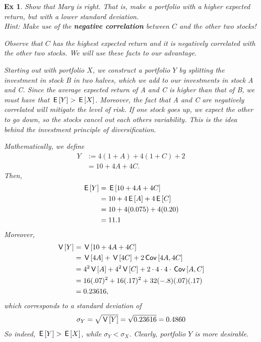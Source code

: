 \documentclass[a4paper,11pt]{article}
\newtheorem{exercise}[theorem]{Ex}
\begin{document}
\begin{exercise}
Show that Mary is right. That is, make a portfolio with a higher expected return, but with a lower standard deviation. \\
\textit{Hint: Make use of the \textbf{negative correlation} between $C$ and the other two stocks!}
\begin{solution}
Observe that $C$ has the highest expected return \textit{and} it is negatively correlated with the other two stocks. We will use these facts to our advantage.

Starting out with portfolio $X$, we construct a portfolio $Y$ by splitting the investment in stock B in two halves, which we add to our investments in stock A and C. Since the average expected return of A and C is higher than that of B, we must have that $\,\mathsf{E}\left[Y\right] > \,\mathsf{E}\left[X\right]$. Moreover, the fact that A and C are negatively correlated will mitigate the level of risk. If one stock goes up, we expect the other to go down, so the stocks cancel out each others variability. This is the idea behind the investment principle of \textit{diversification}.

Mathematically, we define
\begin{align}
    Y &:= 4(1 + A) + 4(1 + C) + 2 \\
    &= 10 + 4A + 4C.
\end{align}
Then,
\begin{align}
    \,\mathsf{E}\left[Y\right] &= \,\mathsf{E}\left[10 + 4A + 4C\right] \\
    &= 10 + 4\,\mathsf{E}\left[A\right] + 4\,\mathsf{E}\left[C\right] \\
    &= 10 + 4(0.075) + 4(0.20) \\
    &= 11.1
\end{align}
Moreover,
\begin{align}
    \,\mathsf{V}\left[Y\right] &= \,\mathsf{V}\left[10 + 4A + 4C\right] \\
    &= \,\mathsf{V}\left[4A\right] + \,\mathsf{V}\left[4C\right] + 2 \,\mathsf{Cov}\left[4A, 4C\right]\\
    &= 4^2\,\mathsf{V}\left[A\right] + 4^2 \,\mathsf{V}\left[C\right] +2 \cdot  4 \cdot 4 \cdot \,\mathsf{Cov}\left[A,C\right] \\
    &= 16 (.07)^2 + 16 (.17)^2  + 32 (-.8)(.07)(.17) \\
    &= 0.23616,
\end{align}
which corresponds to a standard deviation of
\begin{align}
    \sigma_Y = \sqrt{\,\mathsf{V}\left[Y\right]} = \sqrt{0.23616} = 0.4860
\end{align}
So indeed, $\,\mathsf{E}\left[Y\right] > \,\mathsf{E}\left[X\right]$, while $\sigma_Y < \sigma_X$. Clearly, portfolio $Y$ is more desirable.
\end{solution}
\end{exercise}
\end{document}
